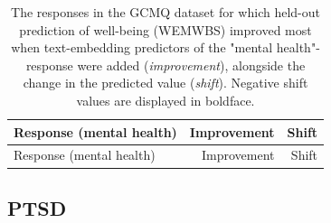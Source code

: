 \documentclass[man,floatsintext]{apa7}
\newcommand{\change}[1]{#1}
\begin{document}
\begingroup\footnotesize
\begin{longtable}{p{12cm}rr}
\caption{The  responses in the GCMQ dataset for which \change{held-out} prediction of well-being (WEMWBS) improved most when text-embedding predictors of the "mental health"-response were added (\emph{improvement}), alongside the change in the predicted value (\emph{shift}). Negative shift values are displayed in boldface.}
\label{tab:examples_GCMQ}\\

\hline

Response (mental health) & Improvement & Shift \\
\hline
\endfirsthead

\hline
Response (mental health) & Improvement & Shift \\
\hline
\endhead


\end{longtable}
\endgroup

\subsection{PTSD}
\end{document}
